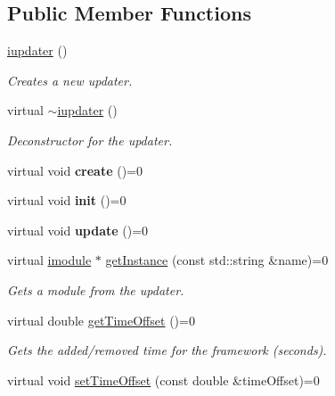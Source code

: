 \subsection*{Public Member Functions}
\begin{DoxyCompactItemize}
\item 
\hyperlink{classflounder_1_1iupdater_acbbc1766a8c236ba89ff55eee9b25850}{iupdater} ()
\begin{DoxyCompactList}\small\item\em Creates a new updater. \end{DoxyCompactList}\item 
virtual \hyperlink{classflounder_1_1iupdater_a70569371d9b898b7d30442a4463fbee4}{$\sim$iupdater} ()
\begin{DoxyCompactList}\small\item\em Deconstructor for the updater. \end{DoxyCompactList}\item 
\mbox{\label{classflounder_1_1iupdater_adf13e2f8614c4c404cf3b4beb44f2674}} 
virtual void {\bfseries create} ()=0
\item 
\mbox{\label{classflounder_1_1iupdater_a5128e5ed39459981c40f17ec7d1de331}} 
virtual void {\bfseries init} ()=0
\item 
\mbox{\label{classflounder_1_1iupdater_a9f9102652e1ec25f7e9fc9b1cd57a041}} 
virtual void {\bfseries update} ()=0
\item 
virtual \hyperlink{classflounder_1_1imodule}{imodule} $\ast$ \hyperlink{classflounder_1_1iupdater_a391b1788b5c139b199ed48033da1b88d}{get\+Instance} (const std\+::string \&name)=0
\begin{DoxyCompactList}\small\item\em Gets a module from the updater. \end{DoxyCompactList}\item 
virtual double \hyperlink{classflounder_1_1iupdater_abd983cbbeed27f28e9be768a2d3b69f2}{get\+Time\+Offset} ()=0
\begin{DoxyCompactList}\small\item\em Gets the added/removed time for the framework (seconds). \end{DoxyCompactList}\item 
virtual void \hyperlink{classflounder_1_1iupdater_aa6aa143e40a5a39bcd53753798438ea1}{set\+Time\+Offset} (const double \&time\+Offset)=0

\end{DoxyCompactItemize}
